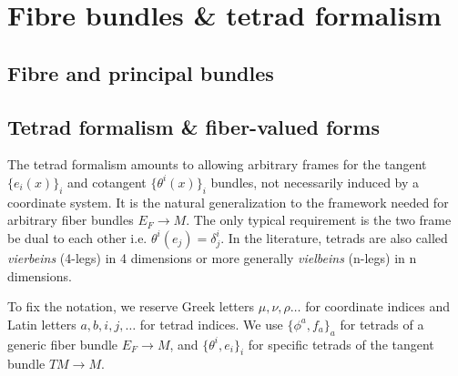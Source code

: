 \documentclass[../geometry_main.tex]{subfiles}
\begin{document}
\chapter{Fibre bundles \&  tetrad formalism}


\section{Fibre and principal bundles}


\section{Tetrad formalism \& fiber-valued forms} 
%

The tetrad formalism amounts to allowing arbitrary frames for the tangent $\{e_i(x)\}_i$ and cotangent  $\{\theta^i(x)\}_i$ bundles, not necessarily induced by a coordinate system.
It is the natural generalization to the framework needed for arbitrary fiber bundles $E_F\to M$.
The only typical requirement is the two frame be dual to each other i.e. $\theta^i (e_j) = \delta^i_j$.
In the literature, tetrads are also called \emph{vierbeins} (4-legs) in 4 dimensions or more generally \emph{vielbeins} (n-legs) in n dimensions.

To fix the notation, we reserve Greek letters $\mu,\nu,\rho\dots$ for coordinate indices and Latin letters $a,b,i,j,\dots$ for tetrad indices.
We use $\{\phi^a, f_a\}_a$ for tetrads of a generic fiber bundle $E_F\to M$, and $\{\theta^i,e_i\}_i$ for specific tetrads of the tangent bundle $TM\to M$.
\end{document}
